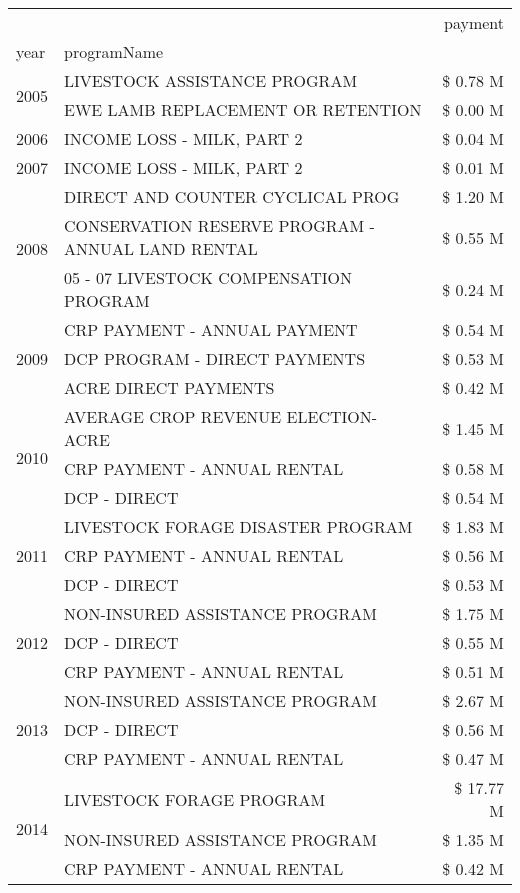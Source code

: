 \begin{tabular}{llr}
\toprule
 &  & payment \\
year & programName &  \\
\midrule
\multirow[t]{2}{*}{2005} & LIVESTOCK ASSISTANCE PROGRAM & \$ 0.78 M \\
 & EWE LAMB REPLACEMENT OR RETENTION & \$ 0.00 M \\
\cline{1-3}
2006 & INCOME LOSS - MILK, PART 2 & \$ 0.04 M \\
\cline{1-3}
2007 & INCOME LOSS - MILK, PART 2 & \$ 0.01 M \\
\cline{1-3}
\multirow[t]{3}{*}{2008} & DIRECT AND COUNTER CYCLICAL PROG & \$ 1.20 M \\
 & CONSERVATION RESERVE PROGRAM - ANNUAL LAND RENTAL & \$ 0.55 M \\
 & 05 - 07 LIVESTOCK COMPENSATION PROGRAM & \$ 0.24 M \\
\cline{1-3}
\multirow[t]{3}{*}{2009} & CRP PAYMENT - ANNUAL PAYMENT & \$ 0.54 M \\
 & DCP PROGRAM - DIRECT PAYMENTS & \$ 0.53 M \\
 & ACRE DIRECT PAYMENTS & \$ 0.42 M \\
\cline{1-3}
\multirow[t]{3}{*}{2010} & AVERAGE CROP REVENUE ELECTION-ACRE & \$ 1.45 M \\
 & CRP PAYMENT - ANNUAL RENTAL & \$ 0.58 M \\
 & DCP - DIRECT & \$ 0.54 M \\
\cline{1-3}
\multirow[t]{3}{*}{2011} & LIVESTOCK FORAGE DISASTER PROGRAM & \$ 1.83 M \\
 & CRP PAYMENT - ANNUAL RENTAL & \$ 0.56 M \\
 & DCP - DIRECT & \$ 0.53 M \\
\cline{1-3}
\multirow[t]{3}{*}{2012} & NON-INSURED ASSISTANCE PROGRAM & \$ 1.75 M \\
 & DCP - DIRECT & \$ 0.55 M \\
 & CRP PAYMENT - ANNUAL RENTAL & \$ 0.51 M \\
\cline{1-3}
\multirow[t]{3}{*}{2013} & NON-INSURED ASSISTANCE PROGRAM & \$ 2.67 M \\
 & DCP - DIRECT & \$ 0.56 M \\
 & CRP PAYMENT - ANNUAL RENTAL & \$ 0.47 M \\
\cline{1-3}
\multirow[t]{3}{*}{2014} & LIVESTOCK FORAGE PROGRAM & \$ 17.77 M \\
 & NON-INSURED ASSISTANCE PROGRAM & \$ 1.35 M \\
 & CRP PAYMENT - ANNUAL RENTAL & \$ 0.42 M \\

\end{tabular}
